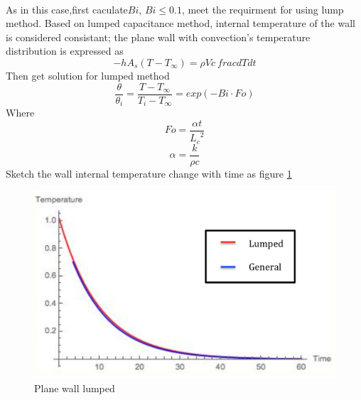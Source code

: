 \begin{solution}
~\\
As in this case,first caculate$Bi$, $Bi\le 0.1$, meet the requirment for using lump method. Based on lumped capacitance method, internal temperature of the wall is considered consistant; the plane wall with convection’s temperature distribution is expressed as
$$-hA_s(T-T_\infty)=\rho Vc\ frac{dT}{dt}$$
Then get solution for lumped method
$$\frac{\theta}{\theta_i}=
\frac{T-T_\infty}{T_i-T_\infty}=exp(-Bi\cdot Fo)
$$
Where
$$Fo=\frac{\alpha t}{{L_c}^2}$$
$$\alpha=\frac{k}{\rho c}$$
Sketch the wall internal temperature change with time as figure \ref{fig:4:2}
\begin{figure}[H]
  \centering
    \includegraphics[scale=1]{figures/ch4/2}
    \caption{Plane wall lumped}
    \label{fig:4:2}
\end{figure}



\end{solution}

